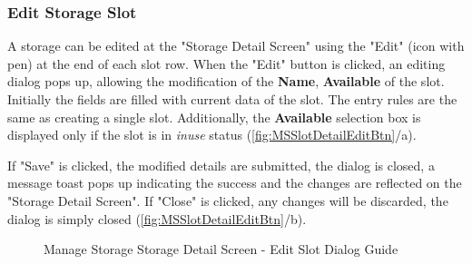 \subsubsection{Edit Storage Slot}
\label{subsubsec:editSlot}
A storage can be edited at the "Storage Detail Screen" using the "Edit" (icon with pen) at the end of each slot row. 
When the "Edit" button is clicked, an editing dialog pops up, allowing the modification of the \textbf{Name}, \textbf{Available} of the slot. Initially the fields are filled with current data of the slot. The entry rules are the same as creating a single slot. Additionally, the \textbf{Available} selection box is displayed only if the slot is in \textit{inuse} status (\autoref{fig:MSSlotDetailEditBtn}/a).

If "Save" is clicked, the modified details are submitted, the dialog is closed, a message toast pops up indicating the success and the changes are reflected on the "Storage Detail Screen". If "Close" is clicked, any changes will be discarded, the dialog is simply closed (\autoref{fig:MSSlotDetailEditBtn}/b).

\begin{figure}[htb!]
	\centering
    \vspace{5pt}
    \vspace{10pt}
    
    \caption{Manage Storage Storage Detail Screen - Edit Slot Dialog Guide}
	\label{fig:MSSlotDetailEditBtn}
\end{figure}

